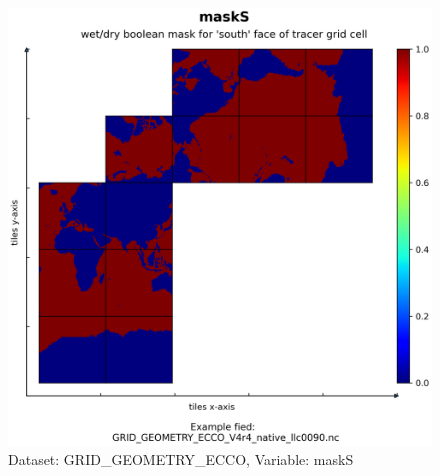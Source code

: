\begin{figure}[H]
\centering
\includegraphics[scale=0.55]{../images/plots/native_plots_coords/Geometry_Parameters_for_the_Lat-Lon-Cap_90_(llc90)_Native_Model_Grid_(Version_4_Release_4)/maskS.png}
\caption{Dataset: GRID\_GEOMETRY\_ECCO, Variable: maskS}
\label{tab:table-GRID_GEOMETRY_ECCO_maskS-Plot}
\end{figure}